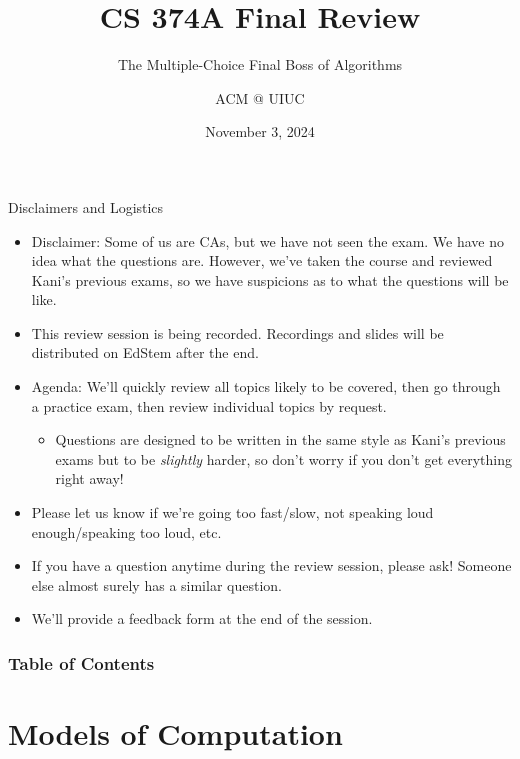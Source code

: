 \documentclass{beamer}
\title[ACM fun]{CS 374A Final Review}
\subtitle{The Multiple-Choice Final Boss of Algorithms}
\author{ACM @ UIUC}
\date{November 3, 2024}
\begin{document}
\begin{frame}
  \titlepage
\end{frame}

\begin{frame}[t]{Disclaimers and Logistics}
  \begin{itemize}
  \item \alert{Disclaimer:} Some of us are CAs, but we have not seen the exam. We have no idea what the questions are. However, we've taken the course and reviewed Kani's previous exams, so we have \alert{suspicions} as to what the questions will be like.
  \item This review session is being recorded. Recordings and slides will be distributed on EdStem after the end.
  \item \alert{Agenda:} We'll quickly review all topics likely to be covered, then go through a practice exam, then review individual topics by request.
  \begin{itemize}
      \item Questions are designed to be written in the same style as Kani's previous exams but to be \textit{slightly} harder, so don't worry if you don't get everything right away!
  \end{itemize}
  \item Please let us know if we're going too fast/slow, not speaking loud enough/speaking too loud, etc.
  \item If you have a question anytime during the review session, please ask! Someone else almost surely has a similar question.
  \item We'll provide a feedback form at the end of the session.
  \end{itemize}
\end{frame}

\begin{frame}
\frametitle{Table of Contents}
\tableofcontents
\end{frame}

\section{Models of Computation}
\end{document}
